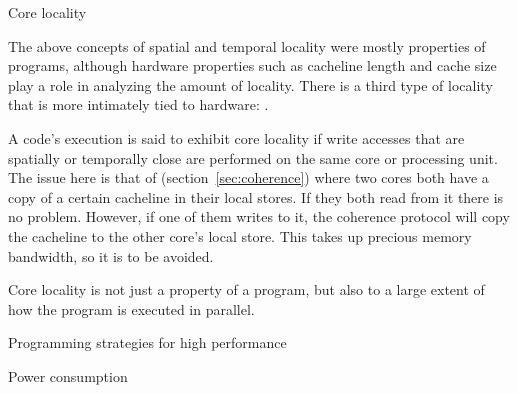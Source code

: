  {Core locality}

The above concepts of spatial and temporal locality were mostly
properties of programs, although hardware properties such as cacheline
length and cache size play a role in analyzing the amount of
locality. There is a third type of locality that is more intimately
tied to hardware: .

A code's execution is said to exhibit core locality if write accesses
that are spatially or temporally close are performed on the same core
or processing unit. The issue here is that of
 (section~\ref{sec:coherence}) where two
cores both have a copy of a certain cacheline in their local stores.
If they both read from it there is no problem. However, if one of them
writes to it, the coherence protocol will copy the cacheline to the
other core's local store. This takes up precious memory bandwidth, so
it is to be avoided.

Core locality is not just a property of a program, but also to a large
extent of how
the program is executed in parallel.

 {Programming strategies for high performance}
\label{sec:performance-programming}


 {Power consumption}
\label{sec:power}


